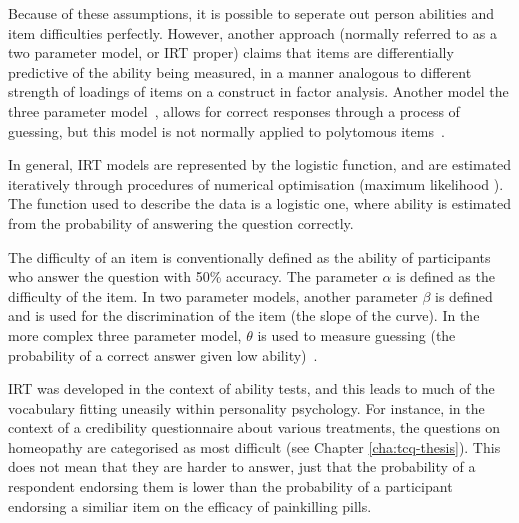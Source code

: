 Because of these assumptions, it is possible to seperate out person abilities and item difficulties perfectly. However, another approach (normally referred to as a two parameter model, or IRT proper) claims that items are differentially predictive of the ability being measured, in a manner analogous to different strength of loadings of items on a construct in factor analysis. Another model the three parameter model~\cite{lord1968statistical}, allows for correct responses through a process of guessing, but this model is not normally applied to polytomous items~\cite{van1997handbook,Mair2010}.


In general, IRT models are represented by the logistic function, and are estimated iteratively through procedures of numerical optimisation (maximum likelihood \cite{fischer1995rasch}). The function used to describe the data is a logistic one, where ability is estimated from the probability of answering the question correctly. %

The difficulty of an item is conventionally defined as the ability of participants who answer the question with 50\% accuracy. The parameter $\alpha$ is defined as the difficulty of the item. In two parameter models, another parameter $\beta$ is defined and is used for the discrimination of the item (the slope of the curve). In the more complex three parameter model, $\theta$ is used to measure guessing (the probability of a correct answer given low ability)~\cite{van1997handbook}.

IRT was developed in the context of ability tests, and this leads to much of the vocabulary fitting uneasily within personality psychology. For instance, in the context of a credibility questionnaire about various treatments, the questions on homeopathy are categorised as most difficult (see Chapter \ref{cha:tcq-thesis}). This does not mean that they are harder to answer, just that the probability of a respondent endorsing them is lower than the probability of a participant endorsing a similiar item on the efficacy of painkilling pills.

